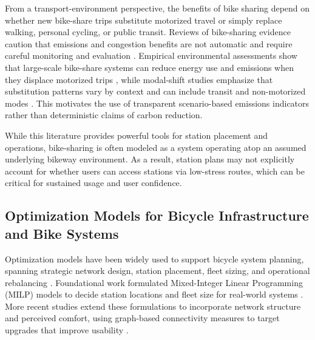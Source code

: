 \documentclass[preprint,authoryear,10pt]{elsarticle}
\begin{document}
From a transport-environment perspective, the benefits of bike sharing depend on whether new bike-share trips substitute motorized travel or simply replace walking, personal cycling, or public transit. Reviews of bike-sharing evidence caution that emissions and congestion benefits are not automatic and require careful monitoring and evaluation \citep{RICCI201528}. Empirical environmental assessments show that large-scale bike-share systems can reduce energy use and emissions when they displace motorized trips \citep{CHEN2022103475}, while modal-shift studies emphasize that substitution patterns vary by context and can include transit and non-motorized modes \citep{fuller2013potential, saltykova2022environmental}. This motivates the use of transparent scenario-based emissions indicators rather than deterministic claims of carbon reduction.

While this literature provides powerful tools for station placement and operations, bike-sharing is often modeled as a system operating atop an assumed underlying bikeway environment. As a result, station plans may not explicitly account for whether users can access stations via low-stress routes, which can be critical for sustained usage and user confidence.

\subsection{Optimization Models for Bicycle Infrastructure and Bike Systems}

Optimization models have been widely used to support bicycle system planning, spanning strategic network design, station placement, fleet sizing, and operational rebalancing \citep{laporte2018Sharedmobilitysystems, shui2020reviewbicyclesharingservice}. Foundational work formulated Mixed-Integer Linear Programming (MILP) models to decide station locations and fleet size for real-world systems \citep{lin2011Strategicdesignpublic, martinez2012OptimisationAlgorithmEstablish, frade2015Bikesharingstationsmaximal, garcia-palomaresOptimizingLocationStations2012}. More recent studies extend these formulations to incorporate network structure and perceived comfort, using graph-based connectivity measures to target upgrades that improve usability \citep{10920161}.
\end{document}
